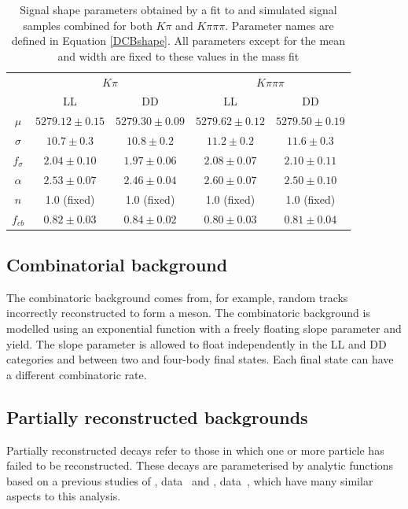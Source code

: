 \begin{table}[h]
\centering
\begin{tabular}{c|cc|cc}
\hline
& \multicolumn{2}{c}{$K\pi$} & \multicolumn{2}{c}{$K\pi\pi\pi$} \\
& LL & DD & LL & DD\\
\hline
$\mu$ & $5279.12 \pm 0.15$ & $5279.30 \pm 0.09$ & $5279.62 \pm 0.12$ & $5279.50 \pm 0.19$ \\
$\sigma$ & $10.7 \pm 0.3$ & $10.8 \pm 0.2$ & $11.2 \pm 0.2$ & $11.6 \pm 0.3$ \\
$f_{\sigma}$ & $2.04 \pm 0.10$ & $1.97 \pm 0.06$ & $2.08 \pm 0.07$ & $2.10 \pm 0.11$ \\
$\alpha$ & $2.53 \pm 0.07$ & $2.46 \pm 0.04$ & $2.60 \pm 0.07$ & $2.50 \pm 0.10$ \\
$n$ & 1.0 (fixed) & 1.0 (fixed) & 1.0 (fixed) & 1.0 (fixed) \\
$f_{cb}$ & $0.82 \pm 0.03$ & $0.84 \pm 0.02$ & $0.80 \pm 0.03$ & $0.81 \pm 0.04	$ \\
\hline
\end{tabular}
\caption{Signal shape parameters obtained by a fit to \runone and \runtwo simulated signal samples combined for both $K\pi$ and $K\pi\pi\pi$. Parameter names are defined in Equation \ref{DCBshape}. All parameters except for the mean and width are fixed to these values in the mass fit}
\label{signalparameters}
\end{table}


\subsection{Combinatorial background}
\label{sec:massfit:combinatorial}

The combinatoric background comes from, for example, random tracks incorrectly reconstructed to form a \D meson. The combinatoric background is modelled using an exponential function with a freely floating slope parameter and yield. The slope parameter is allowed to float independently in the LL and DD categories and between two and four-body \D final states. Each \D final state can have a different combinatoric rate.


\subsection{Partially reconstructed backgrounds}
\label{sec:massfit:partreco}

Partially reconstructed decays refer to those in which one or more particle has failed to be reconstructed. These decays are parameterised by analytic functions based on a previous studies of \decay{\Bm}{\D\Km},  data~\cite{LHCb-PAPER-2016-003} and \decay{\Bz}{\D\Kstarz},  data~\cite{LHCb-PAPER-2016-006}, which have many similar aspects to this analysis.

